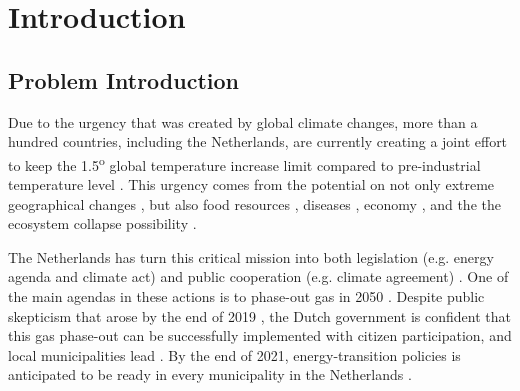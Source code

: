 
\chapter{Introduction}

\section{Problem Introduction}
\label{sec:problemintro}
 
 
Due to the urgency that was created by global climate changes, more than a hundred countries, including the Netherlands, are currently creating a joint effort to keep the 1.5\textsuperscript{o} global temperature increase limit compared to pre-industrial temperature level \citep{ClimateFocus2015TheSummary}. This urgency comes from the potential on not only extreme geographical changes \citep{Rogelj2016GeosciencesParis,Fischer2015AnthropogenicExtremes,Mitchell2016RealizingWorld, Vitousek1994BeyondChange, Sheffield2008ProjectedSimulations}, but also   food resources \citep{Nardone2010EffectsSystems,Amundson2006EnvironmentalCattle,Easterling2005AssessingIPCC, Thornton2010ClimateCountries, Kainuma2004AnalysisModel}, diseases \citep{Stewart2017HalfClimate,Wall2011ClimateEnvironment}, economy \citep{Allison2009VulnerabilityFisheries, Helmke2020ProvisionModel}, and the the ecosystem collapse possibility \citep{New2011FourImplications, Scholze2006AEcosystems}. 

\smallskip{}
The Netherlands has turn this critical mission into both legislation (e.g. energy agenda and  climate act) and public cooperation (e.g. climate agreement) \citep{ClimateCouncil2019ClimateAgreement, PlanningOfficefortheLivingEnvronment2019ClimateAchieved, vanderGoot2019FirstPoints, MinistryofEconomicAffairsandClimate2016EnergySupply}. One of the main agendas in these actions is to phase-out gas in 2050 \citep{Beckman2019TheTransition,Deloitte2013EuropeanContents, PlanningOfficefortheLivingEnvronment2019ClimateAchieved}. Despite public skepticism that arose by the end of 2019 \citep{Corder2019DutchMet, Pieters2019SlightGoals, Tidey2019DutchRuling, BBCNewsServices2019NetherlandsEmissions, DutchNews2019DutchOff, FriendsoftheEarth20192050Phase-out}, the Dutch government is confident that this gas phase-out can be successfully implemented with citizen participation, and local municipalities lead \citep{GovernmentoftheNetherlands2019ClimateAffordable}. By the end of 2021, energy-transition policies is anticipated to be ready in every municipality in the Netherlands \citep{ClimateCouncil2019ClimateAgreement,Yuen2019HighlightsAgreement}. 

